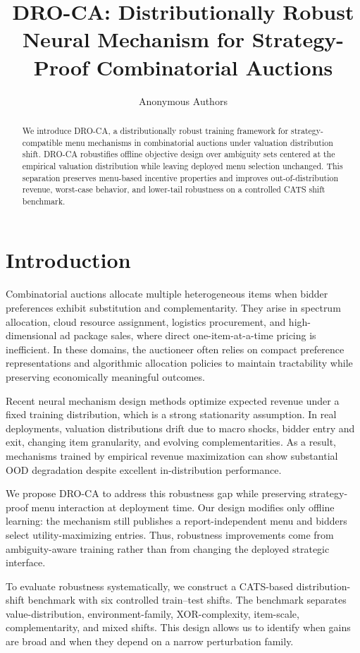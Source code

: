 \documentclass{article}
\title{DRO-CA: Distributionally Robust Neural Mechanism for Strategy-Proof Combinatorial Auctions}
\author{Anonymous Authors}
\begin{document}
\maketitle
\begin{abstract}
We introduce DRO-CA, a distributionally robust training framework for strategy-compatible menu mechanisms in combinatorial auctions under valuation distribution shift. DRO-CA robustifies offline objective design over ambiguity sets centered at the empirical valuation distribution while leaving deployed menu selection unchanged. This separation preserves menu-based incentive properties and improves out-of-distribution revenue, worst-case behavior, and lower-tail robustness on a controlled CATS shift benchmark.
\end{abstract}
\section{Introduction}
Combinatorial auctions allocate multiple heterogeneous items when bidder preferences exhibit substitution and complementarity. They arise in spectrum allocation, cloud resource assignment, logistics procurement, and high-dimensional ad package sales, where direct one-item-at-a-time pricing is inefficient. In these domains, the auctioneer often relies on compact preference representations and algorithmic allocation policies to maintain tractability while preserving economically meaningful outcomes.

Recent neural mechanism design methods optimize expected revenue under a fixed training distribution, which is a strong stationarity assumption. In real deployments, valuation distributions drift due to macro shocks, bidder entry and exit, changing item granularity, and evolving complementarities. As a result, mechanisms trained by empirical revenue maximization can show substantial OOD degradation despite excellent in-distribution performance.

We propose DRO-CA to address this robustness gap while preserving strategy-proof menu interaction at deployment time. Our design modifies only offline learning: the mechanism still publishes a report-independent menu and bidders select utility-maximizing entries. Thus, robustness improvements come from ambiguity-aware training rather than from changing the deployed strategic interface.

To evaluate robustness systematically, we construct a CATS-based distribution-shift benchmark with six controlled train--test shifts. The benchmark separates value-distribution, environment-family, XOR-complexity, item-scale, complementarity, and mixed shifts. This design allows us to identify when gains are broad and when they depend on a narrow perturbation family.
\end{document}
